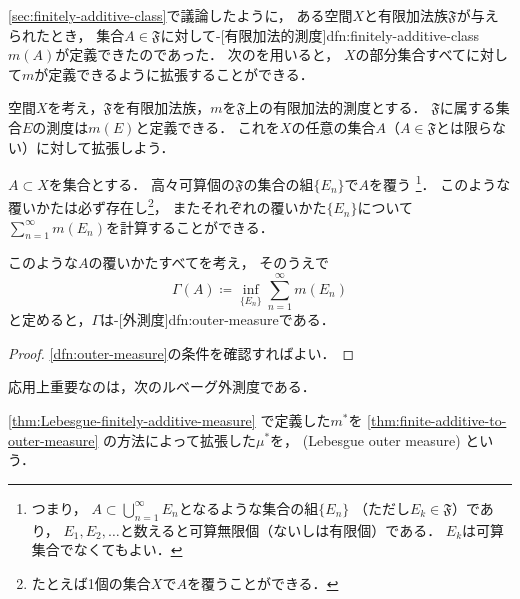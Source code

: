 \documentclass[../sotsu.tex]{subfiles}
\begin{document}
\cref{sec:finitely-additive-class}で議論したように，
ある空間$X$と有限加法族$𝔉$が与えられたとき，
集合$A \in 𝔉$に対して-[有限加法的測度]{dfn:finitely-additive-class}$m(A)$が定義できたのであった．
次のを用いると，
$X$の部分集合すべてに対して$m$が定義できるように拡張することができる．


\begin{theorem}
    \label{thm:finite-additive-to-outer-measure}
    空間$X$を考え，$𝔉$を有限加法族，$m$を$𝔉$上の有限加法的測度とする．
    $𝔉$に属する集合$E$の測度は$m(E)$と定義できる．
    これを$X$の任意の集合$A$（$A \in 𝔉$とは限らない）に対して拡張しよう．

    $A \subset X$を集合とする．
    高々可算個の$𝔉$の集合の組$\{ E_n \}$で$A$を覆う%
    \footnote{
        つまり，
        $\displaystyle A \subset \bigcup_{n=1}^{\infty} E_n$となるような集合の組$ \{ E_n \} $
        （ただし$E_k \in 𝔉$）であり，
        $E_1, E_2, \dotsc$と数えると可算無限個（ないしは有限個）である．
        $E_k$は可算集合でなくてもよい．
    }．
    このような覆いかたは必ず存在し\footnote{たとえば1個の集合$X$で$A$を覆うことができる．}，
    またそれぞれの覆いかた$\{ E_n \}$について
    $\sum_{n=1}^{\infty} m(E_n)$を計算することができる．

    このような$A$の覆いかたすべてを考え，
    そのうえで
    \begin{equation*}
        Γ(A)  \coloneq  \inf_{ \{ E_n \} } \sum_{n=1}^{\infty} m(E_n)
    \end{equation*}
    と定めると，$Γ$は-[外測度]{dfn:outer-measure}である．
\end{theorem}

\begin{proof}
    \cref{dfn:outer-measure}の条件を確認すればよい．
\end{proof}


応用上重要なのは，次のルベーグ外測度である．

\begin{definition}
    \label{dfn:Lebesgue-outer-measure}
    \cref{thm:Lebesgue-finitely-additive-measure}%
    で定義した$m^*$を%
    \cref{thm:finite-additive-to-outer-measure}%
    の方法によって拡張した$\mu^*$を，
    (Lebesgue outer measure)%
    という．
\end{definition}
\end{document}
